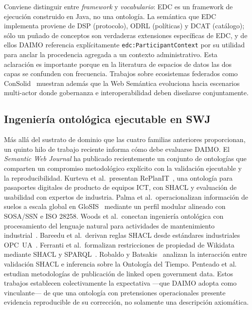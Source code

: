 \documentclass[11pt,a4paper]{article}
\newcommand{\code}[1]{\texttt{#1}}
\begin{document}
Conviene distinguir entre \emph{framework} y \emph{vocabulario}: EDC es un framework de ejecución construido en Java, no una ontología. La semántica que EDC implementa proviene de DSP (protocolo), ODRL (políticas) y DCAT (catálogo); sólo un puñado de conceptos son verdaderas extensiones específicas de EDC, y de ellos DAIMO referencia explícitamente \code{edc:ParticipantContext} por su utilidad para anclar la procedencia agregada a un contexto administrativo. Esta aclaración es importante porque en la literatura de espacios de datos las dos capas se confunden con frecuencia. Trabajos sobre ecosistemas federados como ConSolid~\cite{werbrouck24} muestran además que la Web Semántica evoluciona hacia escenarios multi-actor donde gobernanza e interoperabilidad deben diseñarse conjuntamente.

\subsection{Ingeniería ontológica ejecutable en SWJ}

Más allá del sustrato de dominio que las cuatro familias anteriores proporcionan, un quinto hilo de trabajo reciente informa cómo debe evaluarse DAIMO. El \emph{Semantic Web Journal} ha publicado recientemente un conjunto de ontologías que comparten un compromiso metodológico explícito con la validación ejecutable y la reproducibilidad. Kurteva et al.\ presentan RePlanIT~\cite{kurteva}, una ontología para pasaportes digitales de producto de equipos ICT, con SHACL y evaluación de usabilidad con expertos de industria. Palma et al.\ operacionalizan información de suelos a escala global en GloSIS~\cite{palma} mediante un perfil modular alineado con SOSA/SSN e ISO 28258. Woods et al.\ conectan ingeniería ontológica con procesamiento del lenguaje natural para actividades de mantenimiento industrial~\cite{woods}. Bareedu et al.\ derivan reglas SHACL desde estándares industriales OPC~UA~\cite{bareedu24}. Ferranti et al.\ formalizan restricciones de propiedad de Wikidata mediante SHACL y SPARQL~\cite{ferranti}. Robaldo y Batsakis~\cite{robaldo} analizan la interacción entre validación SHACL e inferencia sobre la Ontología del Tiempo. Penteado et al.~\cite{penteado23} estudian metodologías de publicación de linked open government data. Estos trabajos establecen colectivamente la expectativa ---que DAIMO adopta como vinculante--- de que una ontología con pretensiones operacionales presente evidencia reproducible de su corrección, no solamente una descripción axiomática.
\end{document}

